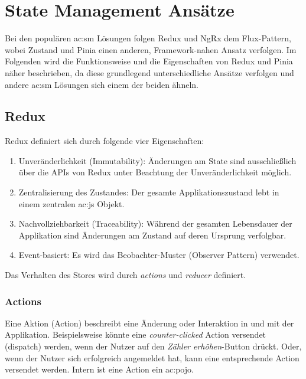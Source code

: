 \chapter{State Management Ansätze} \label{sm-ansaetze}

Bei den populären \acrshort{ac:sm} Lösungen folgen Redux und NgRx dem Flux-Pattern\cite{historyOfRedux}\cite{ngrxGettingStarted}, wobei Zustand und Pinia einen anderen, Framework-nahen Ansatz verfolgen. Im Folgenden wird die Funktionsweise und die Eigenschaften von Redux und Pinia näher beschrieben, da diese grundlegend unterschiedliche Ansätze verfolgen und andere \acrshort{ac:sm} Lösungen sich einem der beiden ähneln.

\section{Redux}

Redux definiert sich durch folgende vier Eigenschaften:
\begin{enumerate}
  \item Unveränderlichkeit (Immutability): Änderungen am State sind ausschließlich über die APIs von Redux unter Beachtung der Unveränderlichkeit möglich.
  \item Zentralisierung des Zustandes: Der gesamte Applikationszustand lebt in einem zentralen \acrlong{ac:js} Objekt.
  \item Nachvollziehbarkeit (Traceability): Während der gesamten Lebensdauer der Applikation sind Änderungen am Zustand auf deren Ursprung verfolgbar.
  \item Event-basiert: Es wird das Beobachter-Muster (Observer Pattern) verwendet.
\end{enumerate}

Das Verhalten des Stores wird durch \textit{actions} und \textit{reducer} definiert.

\subsection{Actions}

Eine Aktion (Action) beschreibt eine Änderung oder Interaktion in und mit der Applikation. Beispielsweise könnte eine \textit{counter-clicked} Action versendet (dispatch) werden, wenn der Nutzer auf den \textit{Zähler erhöhen}-Button drückt. Oder, wenn der Nutzer sich erfolgreich angemeldet hat, kann eine entsprechende Action versendet werden. Intern ist eine Action ein \acrshort{ac:pojo}.\cite{reduxStateActionReducers}

